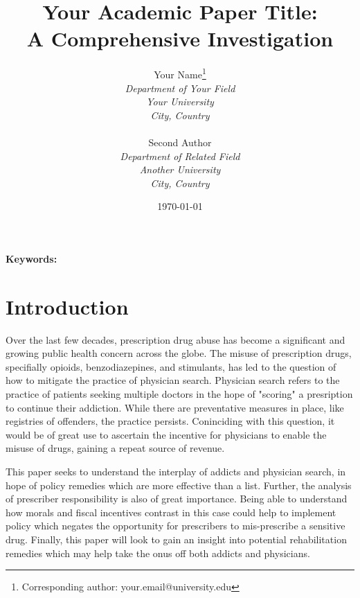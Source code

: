 \documentclass[11pt,a4paper]{article}
\title{Your Academic Paper Title: \\
A Comprehensive Investigation}
\author{
    Your Name\thanks{Corresponding author: your.email@university.edu} \\
    \textit{Department of Your Field} \\
    \textit{Your University} \\
    \textit{City, Country} \\
    \\
    Second Author \\
    \textit{Department of Related Field} \\
    \textit{Another University} \\
    \textit{City, Country}
}
\date{\today}
\newenvironment{abstract}%
{\cleardoublepage\null \vfill\begin{center}%
\bfseries \abstractname \end{center}}%
{\vfill\null}
\begin{document}
\maketitle
\thispagestyle{empty}

\begin{abstract}
\noindent %

\vspace{0.3cm}
\noindent \textbf{Keywords:} %
\end{abstract}

\newpage
\setcounter{page}{1}

\section{Introduction}
\label{sec:introduction}

Over the last few decades, prescription drug abuse has become a significant and growing public health concern across the globe. The misuse of prescription drugs, specifially opioids, benzodiazepines, and stimulants, has led to the question of how to mitigate the practice of
physician search. Physician search refers to the practice of patients seeking multiple doctors in the hope of "scoring" a presription to continue their addiction. While there are preventative measures in place, like registries of offenders, the practice persists. Coninciding
with this question, it would be of great use to ascertain the incentive for physicians to enable the misuse of drugs, gaining a repeat source of revenue.

This paper seeks to understand the interplay of addicts and physician search, in hope of policy remedies which are more effective than a list. Further, the analysis of prescriber responsibility is also of great importance. Being able to understand how morals and fiscal
incentives contrast in this case could help to implement policy which negates the opportunity for prescribers to mis-prescribe a sensitive drug. Finally, this paper will look to gain an insight into potential rehabilitation remedies which may help take the onus off both
addicts and physicians.

\end{document}
